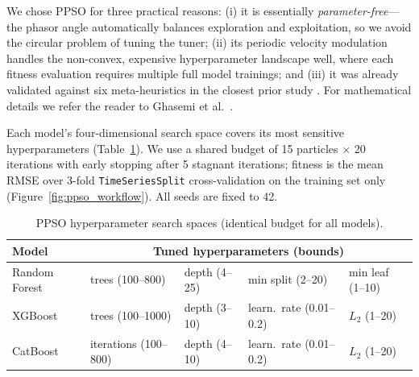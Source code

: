 We chose PPSO for three practical reasons: (i) it is essentially \emph{parameter-free}---the phasor angle automatically balances exploration and exploitation, so we avoid the circular problem of tuning the tuner; (ii) its periodic velocity modulation handles the non-convex, expensive hyperparameter landscape well, where each fitness evaluation requires multiple full model trainings; and (iii) it was already validated against six meta-heuristics in the closest prior study \parencite{zhang2023catboostppso}. For mathematical details we refer the reader to Ghasemi et al.\ \parencite{ghasemi2019ppso}.

Each model's four-dimensional search space covers its most sensitive hyperparameters (Table~\ref{tab:search_spaces}). We use a shared budget of 15 particles $\times$ 20 iterations with early stopping after 5 stagnant iterations; fitness is the mean RMSE over 3-fold \texttt{TimeSeriesSplit} cross-validation on the training set only (Figure~\ref{fig:ppso_workflow}). All seeds are fixed to 42.

\begin{table}[H]
\centering
\caption{PPSO hyperparameter search spaces (identical budget for all models).}
\label{tab:search_spaces}
\small
\begin{tabular}{@{}lllll@{}}
\toprule
\textbf{Model} & \multicolumn{4}{c}{\textbf{Tuned hyperparameters (bounds)}} \\
\midrule
Random Forest & trees (100--800) & depth (4--25) & min split (2--20) & min leaf (1--10) \\
XGBoost & trees (100--1000) & depth (3--10) & learn.\ rate (0.01--0.2) & $L_2$ (1--20) \\
CatBoost & iterations (100--800) & depth (4--10) & learn.\ rate (0.01--0.2) & $L_2$ (1--20) \\
\bottomrule
\end{tabular}
\end{table}


